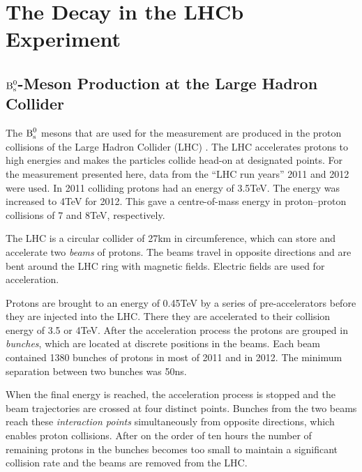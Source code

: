 \section{The \texorpdfstring{\BstoJpsiKK}{Bs0->J/psi K+K-} Decay in the LHCb Experiment}
\label{sec:intro_LHCb}

\subsection{\texorpdfstring{$\text{B}_\text{s}^\text{0}$}{Bs0}-Meson Production at the Large Hadron Collider}
\label{subsec:intro_LHCb_LHC}

The $\text{B}_\text{s}^\text{0}$ mesons that are used for the \BstoJpsiKK{} measurement are produced in the proton collisions of the Large Hadron Collider (LHC)
\cite{Evans:2008zzb}. The LHC accelerates protons to high energies and makes the particles collide head-on at designated points. For the
measurement presented here, data from the ``LHC run years'' 2011 and 2012 were used. In 2011 colliding protons had an energy of
3.5\unitsp{}TeV.  The energy was increased to 4\unitsp{}TeV for 2012. This gave a centre-of-mass energy in proton--proton collisions of 7
and 8\unitsp{}TeV, respectively.

The LHC is a circular collider of 27\unitsp{}km in circumference, which can store and accelerate two \emph{beams} of protons. The beams
travel in opposite directions and are bent around the LHC ring with magnetic fields. Electric fields are used for acceleration.

Protons are brought to an energy of 0.45\unitsp{}TeV by a series of pre-accelerators before they are injected into the LHC. There they are
accelerated to their collision energy of 3.5 or 4\unitsp{}TeV. After the acceleration process the protons are grouped in \emph{bunches},
which are located at discrete positions in the beams. Each beam contained 1380 bunches of  protons in most of 2011 and in 2012.
The minimum separation between two bunches was 50\unitsp{}ns.

When the final energy is reached, the acceleration process is stopped and the beam trajectories are crossed at four distinct points.
Bunches from the two beams reach these \emph{interaction points} simultaneously from opposite directions, which enables proton collisions.
After on the order of ten hours the number of remaining protons in the bunches becomes too small to maintain a significant collision rate
and the beams are removed from the LHC.

